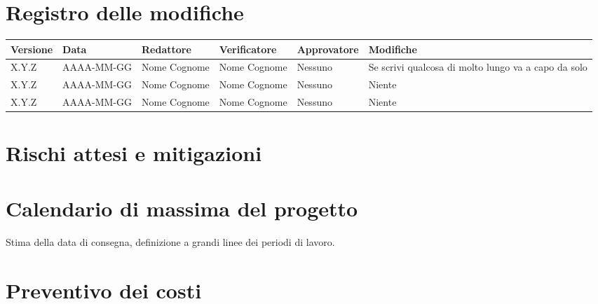 \documentclass[a4paper, 12pt]{article}
\begin{document}

\copertina{}
\newpage

\section*{Registro delle modifiche}

\begin{table}[H]
	\renewcommand{\arraystretch}{1.5}
	\centering
	\fontsize{10}{12}\selectfont
	\begin{tabularx}{\textwidth}{l|l|l|l|l|X}
		\textbf{Versione}     & \textbf{Data}        & \textbf{Redattore} &
		\textbf{Verificatore} & \textbf{Approvatore} & \textbf{Modifiche}                                      \\
		\toprule
		X.Y.Z                 & AAAA-MM-GG           & Nome Cognome       & Nome Cognome & Nessuno & Se scrivi
		qualcosa di molto lungo va a capo da solo                                                              \\
		X.Y.Z                 & AAAA-MM-GG           & Nome Cognome       & Nome Cognome & Nessuno & Niente    \\
		X.Y.Z                 & AAAA-MM-GG           & Nome Cognome       & Nome Cognome & Nessuno & Niente    \\
		\bottomrule
	\end{tabularx}
\end{table}

\newpage

\section{Rischi attesi e mitigazioni}

\section{Calendario di massima del progetto}

Stima della data di consegna, definizione a grandi linee dei periodi di lavoro.

\section{Preventivo dei costi}
\end{document}
